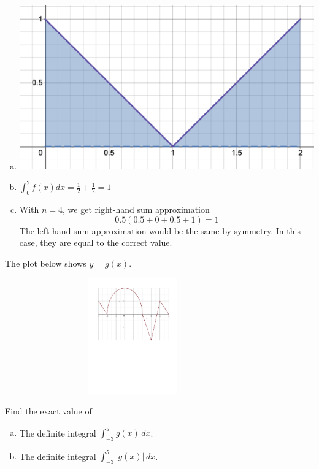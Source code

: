\documentclass[11pt]{exam}
\begin{document}
\begin{questions}
\begin{enumerate}[(a)]
\end{enumerate}
\begin{solution}
  \begin{enumerate}[(a)]
  \item \includegraphics[scale=0.3]{Figures/s2}
  \item \(\int_0^2 f(x) dx = \frac{1}{2} + \frac{1}{2} = 1\)
  \item With \(n=4\), we get right-hand sum approximation \[
      0.5(0.5+0+0.5+1) = 1
    \]
  The left-hand sum approximation would be the same by symmetry. In
  this case, they are equal to the correct value.
  \end{enumerate}
\end{solution}
\question The plot below shows $y=g(x)$.
  \begin{center}
\includegraphics[width=11cm,height=5cm]{Figures/fig2.pdf}
  \end{center}
Find the exact value of
\begin{multicols}{2}
\begin{enumerate}[(a)]
	\item The definite integral $\displaystyle\int_{-3}^5g(x)\,dx$.
	\item The definite integral $\displaystyle\int_{-3}^5|g(x)|\,d x$.
\end{enumerate}
\end{multicols}

\end{questions}
\end{document}
